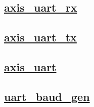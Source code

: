 \documentclass{article}
\begin{document}
  


  \subsection{\href{../files/axis_uart_rx-v.html}{axis\_uart\_rx}}

  \subsection{\href{../files/axis_uart_tx-v.html}{axis\_uart\_tx}}

  \subsection{\href{../files/axis_uart-v.html}{axis\_uart}}

  \subsection{\href{../files/uart_baud_gen-v.html}{uart\_baud\_gen}}
\end{document}
